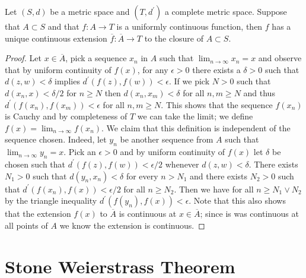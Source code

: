 \begin{prop}\label{ExtensionOfUniformlyContinuousMapCompleteRange}Let $(S,d)$ be a metric space and $(T,d^\prime)$ a
  complete metric space.  Suppose that $A \subset S$ and that $f: A
  \to T$ is a uniformly continuous function, then $f$ has a unique
continuous  extension $\overline{f} : \overline{A} \to T$ to the closure of $A
  \subset S$.  
\end{prop}
\begin{proof}
Let $x \in \overline{A}$, pick a sequence $x_n$
in $A$ such that $\lim_{n \to \infty} x_n = x$ and observe that by
uniform continuity of $f(x)$, for
any $\epsilon > 0$ there exists a $\delta > 0$ such that $d(z,w)
< \delta$ implies $d^\prime(f(z) , f(w)) < \epsilon$.  If we pick $N > 0$
such that $d(x_n,x) < \delta/2$ for $n \geq N$ then
$d(x_n, x_m) < \delta$ for all $n,m \geq N$ and thus $d^\prime(f(x_n), f(x_m)) < \epsilon$ for all
$n,m \geq N$.  This shows that the sequence $f(x_n)$ is Cauchy and by
completeness of $T$ we can take the limit; we define $f(x) =
\lim_{n\to \infty} f(x_n)$.  We claim that this definition is
independent of the sequence chosen.  Indeed, let $y_n$ be another
sequence from $A$ such that $\lim_{n \to \infty} y_n = x$.  Pick an
$\epsilon > 0$ and by uniform continuity of $f(x)$ let $\delta$ be
chosen such that $d^\prime(f(z),f(w)) < \epsilon/2$ whenever $d(z,w) < \delta$.
There exists $N_1 > 0$ such that $d(y_n, x_n) < \delta$ for every
$n > N_1$ and there exists $N_2 > 0$ such that $d^\prime(f(x_n),f(x)) <
\epsilon/2$ for all $n \geq N_2$.  Then we have for all $n \geq N_1 \vee
N_2$ by the triangle inequality $d^\prime(f(y_n), f(x)) < \epsilon$.
Note that this also shows that the extension $f(x)$ to $\overline{A}$ is
continuous at $x \in \overline{A}$; since is was continuous at all points
of $A$ we know the extension is continuous.  
\end{proof}

\section{Stone Weierstrass Theorem}

